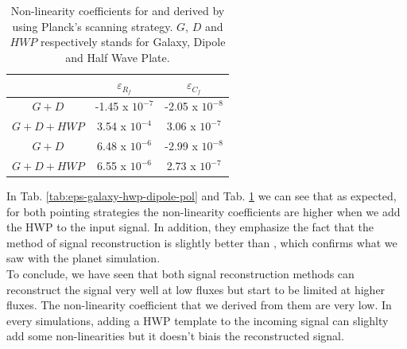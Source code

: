 
\begin{table}[h!]
\center
	\begin{tabular}{|c|c|c|}
  	\hline
 	\backslashbox{$\varepsilon$}{$Input signal$} & $	\varepsilon_{R_{f}}$ & $\varepsilon_{C_{f}} $ \\
	\hline
	$G+D$  & -1.45 x $10^{-7}$ & -2.05 x $10^{-8}$ \\
  	\hline
 	$G+D+HWP$ & 3.54 x $10^{-4}$ & 3.06 x $10^{-7}$ \\
 	\hline
 	$G+D$  & 6.48 x $10^{-6}$ & -2.99 x $10^{-8}$ \\
  	\hline
 	$G+D+HWP$ & 6.55 x $10^{-6}$ & 2.73 x $10^{-7}$ \\
  	\hline
	\end{tabular} 
\caption{Non-linearity coefficients \eps for \rf and \cf derived by using Planck's scanning strategy. $G$, $D$ and $HWP$ respectively stands for Galaxy, Dipole and Half Wave Plate.}
\label{tab:eps-galaxy-hwp-dipole-planck}
\end{table}
In Tab. \ref{tab:eps-galaxy-hwp-dipole-pol} and Tab. \ref{tab:eps-galaxy-hwp-dipole-planck} we can see that as expected, for both pointing strategies the non-linearity coefficients are higher when we add the HWP to the input signal. In addition, they emphasize the fact that the \cf method of signal reconstruction is slightly better than \rf, which confirms what we saw with the planet simulation.\\

To conclude, we have seen that both signal reconstruction methods can reconstruct the signal very well at low fluxes but start to be limited at higher fluxes. The non-linearity coefficient that we derived from them are very low. In every simulations, adding a HWP template to the incoming signal can slighlty add some non-linearities but it doesn't biais the reconstructed signal.\\

